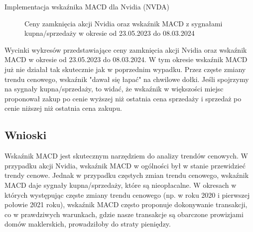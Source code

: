 \documentclass{article}
\begin{document}
\begin{section}{Implementacja wskaźnika MACD dla Nvidia (NVDA)}
    \begin{figure}[H]
        \caption{Ceny zamknięcia akcji Nvidia oraz wskaźnik MACD z sygnałami kupna/sprzedaży w okresie od 23.05.2023 do 08.03.2024}
    \end{figure}
    Wycinki wykresów przedstawiające ceny zamknięcia akcji Nvidia oraz wskaźnik MACD w okresie od 23.05.2023 do 08.03.2024.
    W tym okresie wskaźnik MACD już nie działał tak skutecznie jak w poprzednim wypadku. Przez częste zmiany trendu cenowego,
    wskaźnik "dawał się łapać" na chwilowe dołki. Jeśli spojrzymy na sygnały kupna/sprzedaży, to widać, że wskaźnik w większości miejsc
    proponował zakup po cenie wyższej niż ostatnia cena sprzedaży i sprzedaż po cenie niższej niż ostatnia cena zakupu.

    \subsection{Wnioski}
    Wskaźnik MACD jest skutecznym narzędziem do analizy trendów cenowych. W przypadku akcji Nvidia, wskaźnik MACD w ogólności był w stanie przewidzieć trendy cenowe.
    Jednak w przypadku częstych zmian trendu cenowego, wskaźnik MACD daje sygnały kupna/sprzedaży, które są nieopłacalne. W okresach w których występując
    częste zmiany trendu cenowego (np. w roku 2020 i pierwszej połowie 2021 roku), wskaźnik MACD często proponuje dokonywanie transakcji, co w prawdziwych 
    warunkach, gdzie nasze transakcje są obarczone prowizjami domów maklerskich, prowadziłoby do straty pieniędzy.
\end{section}
\end{document}
